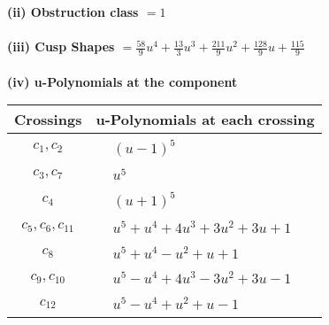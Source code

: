\documentclass[1p]{elsarticle_modified}
\theoremstyle{definition}
\begin{document}
\flushleft \textbf{(ii) Obstruction class $= 1$}\\~\\
\flushleft \textbf{(iii) Cusp Shapes $= \frac{58}{9} u^4+\frac{13}{3} u^3+\frac{211}{9} u^2+\frac{128}{9} u+\frac{115}{9}$}\\~\\
\newpage\renewcommand{\arraystretch}{1}
\flushleft \textbf{(iv) u-Polynomials at the component}\newline \\
\begin{tabular}{m{50pt}|m{274pt}}
Crossings & \hspace{64pt}u-Polynomials at each crossing \\
\hline $$\begin{aligned}c_{1},c_{2}\end{aligned}$$&$\begin{aligned}
&(u-1)^5
\end{aligned}$\\
\hline $$\begin{aligned}c_{3},c_{7}\end{aligned}$$&$\begin{aligned}
&u^5
\end{aligned}$\\
\hline $$\begin{aligned}c_{4}\end{aligned}$$&$\begin{aligned}
&(u+1)^5
\end{aligned}$\\
\hline $$\begin{aligned}c_{5},c_{6},c_{11}\end{aligned}$$&$\begin{aligned}
&u^5+u^4+4 u^3+3 u^2+3 u+1
\end{aligned}$\\
\hline $$\begin{aligned}c_{8}\end{aligned}$$&$\begin{aligned}
&u^5+u^4- u^2+u+1
\end{aligned}$\\
\hline $$\begin{aligned}c_{9},c_{10}\end{aligned}$$&$\begin{aligned}
&u^5- u^4+4 u^3-3 u^2+3 u-1
\end{aligned}$\\
\hline $$\begin{aligned}c_{12}\end{aligned}$$&$\begin{aligned}
&u^5- u^4+u^2+u-1
\end{aligned}$\\
\hline
\end{tabular}\\~\\
\end{document}
